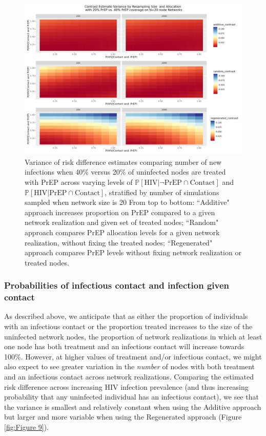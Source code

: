 \documentclass{article}
\theoremstyle{definition}
\begin{document}
\begin{figure}[H]
    \centering
    \includegraphics[width=\linewidth]{Corrected Figures/Resampling Size Variance Plot.png}
    \caption{Variance of risk difference estimates comparing number of new infections when 40\% versus 20\% of uninfected nodes are treated with PrEP across varying levels of $\mathbb{P}\left[\text{HIV} \vert \neg \text{PrEP} \cap \text{Contact}\right]$ and $\mathbb{P}\left[\text{HIV} \vert \text{PrEP} \cap \text{Contact}\right]$, stratified by number of simulations sampled when network size is 20 %
    From top to bottom: ``Additive" approach increases proportion on PrEP compared to a given network realization and given set of treated nodes; ``Random" approach compares PrEP allocation levels for a given network realization, without fixing the treated nodes; ``Regenerated" approach compares PrEP levels without fixing network realization or treated nodes. }
    \label{fig:Figure 8}
\end{figure}

\subsubsection{Probabilities of infectious contact and infection given contact}
As described above, we anticipate that as either the proportion of individuals with an infectious contact or the proportion treated increases to the size of the uninfected network nodes, the proportion of network realizations in which at least one node has both treatment and an infectious contact will increase towards 100\%. However, at higher values of treatment and/or infectious contact, we might also expect to see greater variation in the \textit{number} of nodes with both treatment and an infectious contact across network realizations. Comparing the estimated risk difference across increasing HIV infection prevalence (and thus increasing probability that any uninfected individual has an infectious contact), we see that the variance is smallest and relatively constant when using the Additive approach but larger and more variable when using the Regenerated approach (Figure \ref{fig:Figure 9}).
\end{document}
